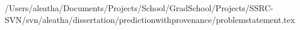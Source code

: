 /Users/aleatha/Documents/Projects/School/GradSchool/Projects/SSRC-SVN/svn/aleatha/dissertation/predictionwithprovenance/problemstatement.tex